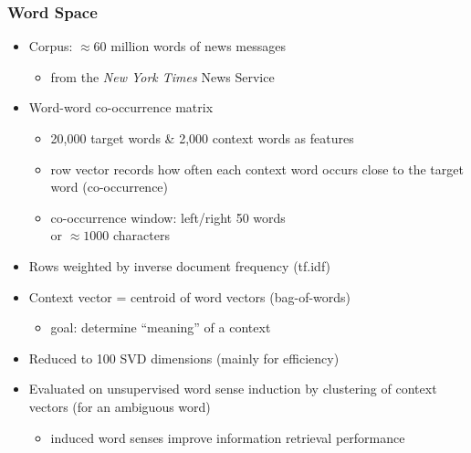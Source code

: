 \begin{frame}
  \frametitle{Word Space \citep{Schuetze:92,Schuetze:93,Schuetze:98}}

  \begin{itemize}
  \item Corpus: $\approx 60$ million words of news messages
    \begin{itemize}
    \item from the \emph{New York Times} News Service
    \end{itemize}
  \item Word-word co-occurrence matrix
    \begin{itemize}
    \item 20,000 target words \& 2,000 context words as features
    \item row vector records how often each context word occurs close
      to the target word (co-occurrence)
    \item co-occurrence window: left/right 50 words \citep{Schuetze:98}\\
      or $\approx 1000$ characters \citep{Schuetze:92}
    \end{itemize}
  \item Rows weighted by inverse document frequency (tf.idf)
  \item Context vector = centroid of word vectors (bag-of-words)
    \begin{itemize}
    \item[\hand] goal: determine ``meaning'' of a context
    \end{itemize}
  \item Reduced to 100 SVD dimensions (mainly for efficiency)
  \item Evaluated on unsupervised word sense induction by clustering
    of context vectors (for an ambiguous word)
    \begin{itemize}
    \item induced word senses improve information retrieval performance
    \end{itemize}
  \end{itemize}
\end{frame}

